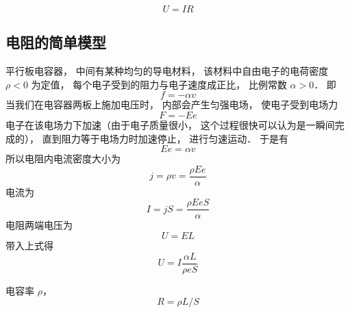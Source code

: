 

\begin{equation}
U = IR
\end{equation}


\subsection{电阻的简单模型}
平行板电容器， 中间有某种均匀的导电材料， 该材料中自由电子的电荷密度 $\rho < 0$ 为定值， 每个电子受到的阻力与电子速度成正比， 比例常数 $\alpha > 0$． 即
\begin{equation}
f = -\alpha v
\end{equation}
当我们在电容器两板上施加电压时， 内部会产生匀强电场， 使电子受到电场力
\begin{equation}
F = -Ee
\end{equation}
电子在该电场力下加速（由于电子质量很小， 这个过程很快可以认为是一瞬间完成的）， 直到阻力等于电场力时加速停止， 进行匀速运动． 于是有
\begin{equation}
Ee = \alpha v
\end{equation}
所以电阻内电流密度大小为
\begin{equation}
j = \rho v = \frac{\rho Ee}{\alpha}
\end{equation}
电流为
\begin{equation}
I = jS = \frac{\rho EeS}{\alpha}
\end{equation}
电阻两端电压为
\begin{equation}
U = EL
\end{equation}
带入上式得
\begin{equation}
U = I \frac{\alpha L}{\rho eS}
\end{equation}



电容率 $\rho$， 
\begin{equation}
R = \rho L / S
\end{equation}
